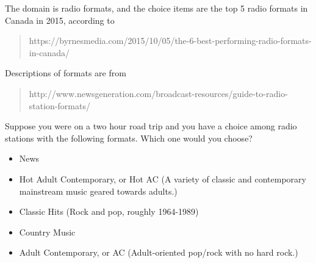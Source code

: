 The domain is radio formats, and the choice items are the top 5 radio formats in Canada in 2015, according to
\begin{quotation}
	https://byrnesmedia.com/2015/10/05/the-6-best-performing-radio-formats-in-canada/
\end{quotation}
Descriptions of formats are from
\begin{quotation}
	http://www.newsgeneration.com/broadcast-resources/guide-to-radio-station-formats/
\end{quotation}

\begin{tcolorbox}
Suppose you were on a two hour road trip and you have a choice among radio stations with the following formats.
Which one would you choose?

\begin{itemize}
	\item News
	\item Hot Adult Contemporary, or Hot AC
	(A variety of classic and contemporary mainstream music geared towards adults.)
	\item Classic Hits (Rock and pop, roughly 1964-1989)
	\item Country Music
	\item Adult Contemporary, or AC (Adult-oriented pop/rock with no hard rock.)
\end{itemize}
\end{tcolorbox}
